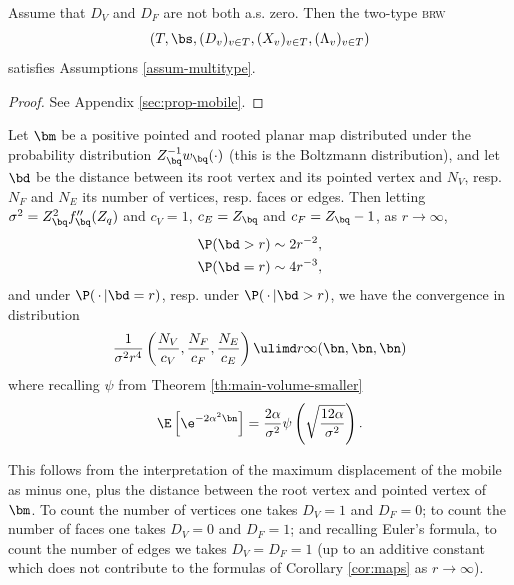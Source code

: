 \documentclass[10pt,a4paper]{article}
\newcommand{\brw}{\textsc{brw}\xspace}
\begin{document}
\begin{proposition}\label{prop:mobile}
Assume that $D_V$ and $D_F$ are not both a.s. zero. Then the two-type \brw 
\[ (T, \bs, (D_v)_{v\in T}, (X_v)_{v\in T}, (\Lambda_v)_{v\in T}) \]
satisfies Assumptions \ref{assum-multitype}. 
\end{proposition}

\begin{proof}
See Appendix \ref{sec:prop-mobile}.
\end{proof}



\begin{corollary}\label{cor:maps}
Let $\bm$ be a positive pointed and rooted planar map distributed under the probability distribution $Z_\bq^{-1} w_\bq(\cdot)$ (this is the Boltzmann distribution), and let $\bd$ be the distance between its root vertex and its pointed vertex and $N_V$, resp. $N_F$ and $N_E$ its number of vertices, resp. faces or edges. Then letting $\sigma^2 = Z_\bq^2 f_\bq''(Z_q)$ and $c_V = 1$, $c_E=Z_\bq$ and $c_F = Z_\bq-1$, 
as $r\to\infty$, 
\begin{align}
	\P(\bd > r) &\sim 2 r^{-2} , \\
	\P(\bd = r) &\sim 4 r^{-3} ,
\end{align}
and under $\P(\, \cdot \, | \bd = r)$, resp. under $\P(\, \cdot \, | \bd>r)$, we have the convergence in distribution
\[ \frac{1}{\sigma^2 r^4} \left(\frac{N_V}{c_V} , \frac{N_F}{c_F}, \frac{N_E}{c_E}\right) \ulimd r \infty (\bn, \bn, \bn) \]
where recalling $\psi$ from Theorem \ref{th:main-volume-smaller}
\[ \E\left[ \e^{-2\alpha^2 \bn} \right] = \frac{2\alpha}{\sigma^2} \psi\left(\sqrt{\frac{12\alpha}{\sigma^2}}\right) . \]
\end{corollary}


This follows from the interpretation of the maximum displacement of the mobile as minus one, plus the distance between the root vertex and pointed vertex of $\bm$. 
To count the number of vertices one takes $D_V = 1$ and $D_F = 0$; to count the number of faces one takes $D_V = 0$ and $D_F = 1$; and recalling Euler's formula, to count the number of edges we takes $D_V = D_F = 1$ (up to an additive constant which does not contribute to the formulas of Corollary \ref{cor:maps} as $r\to\infty$). 
\end{document}
